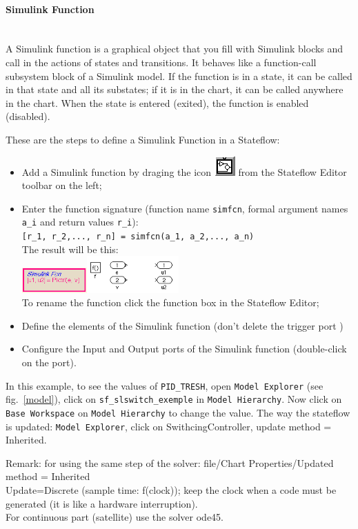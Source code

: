 \documentclass[a4paper]{article}
\begin{document}
\paragraph{Simulink Function}~\\
A Simulink function is a graphical object that you fill with Simulink blocks and call in the
actions of states and transitions. It behaves like a function-call subsystem block of a Simulink
model. If the function is in a state, it can be called in that state and all its
substates; if it is in the chart, it can be called anywhere in the chart. When the state is entered
(exited), the function is enabled (disabled).

These are the steps to define a Simulink Function in a Stateflow:
\begin{itemize}
\item Add a Simulink function by draging the icon \includegraphics[width=.6cm]{addFcn} from the
	Stateflow Editor toolbar on the left;	
\item Enter the function signature (function name {\tt simfcn}, formal argument names {\tt a\_i} 
	and return values {\tt r\_i}):\\
	{\tt [r\_1, r\_2,..., r\_n] = simfcn(a\_1, a\_2,..., a\_n)}\\
	The result will be this: \\
	\includegraphics[width=2.5cm]{blockFcn}\includegraphics[width=3.5cm]{bFcn}\\
	To rename the function click the function box in the Stateflow Editor;
\item Define the elements of the Simulink function (don't delete the trigger port )
\item Configure the Input and Output ports of the Simulink function (double-click on the port).
\end{itemize}

In this example, to see the values of {\tt PID\_TRESH}, open {\tt Model Explorer}
(see fig.~\ref{model}), click on {\tt sf\_slswitch\_exemple} in {\tt Model Hierarchy}. 
Now click on {\tt Base Workspace} on {\tt Model Hierarchy} to change the value. 
The way the stateflow is updated: {\tt Model Explorer}, click on SwithcingController, 
update method = Inherited.
 
\vspace{.3cm} \noindent
Remark: for using the same step of the solver: file/Chart Properties/Updated method = Inherited\\
Update=Discrete (sample time: f(clock)); keep the clock when a code must be generated
(it is like a hardware interruption).\\
For continuous part (satellite) use the solver ode45.
\end{document}
